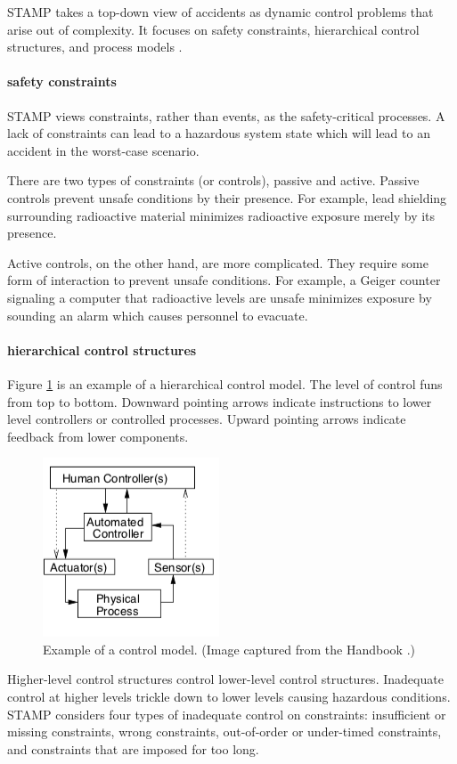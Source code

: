 \documentclass[../../main/main.tex]{subfiles}
\begin{document}
STAMP takes a top-down view of accidents as dynamic control problems that arise out of complexity.  It focuses on safety constraints, hierarchical control structures, and process models \cite{saferworld}. 

\paragraph*{safety constraints}
STAMP views constraints, rather than events, as the safety-critical processes.  A lack of constraints can lead to a hazardous system state which will lead to an accident in the worst-case scenario.  

There are two types of constraints (or controls), passive and active.  Passive controls prevent unsafe conditions by their presence.  For example, lead shielding surrounding radioactive material minimizes radioactive exposure merely by its presence.  

Active controls, on the other hand, are more complicated.  They require some form of interaction to prevent unsafe conditions.  For example, a Geiger counter signaling a computer that radioactive levels are unsafe minimizes exposure by sounding an alarm which causes personnel to evacuate.  

\paragraph*{hierarchical control structures}
Figure \ref{controlmodel} is an example of a hierarchical control model.  The level of control funs from top to bottom.  Downward pointing arrows indicate instructions to lower level controllers or controlled processes.  Upward pointing arrows indicate feedback from lower components.   

\begin{figure}[h!]
\centering
\includegraphics[width=0.5\linewidth]{../figures/controlmodel}
\caption{\label{controlmodel} Example of a control model. (Image captured from the  Handbook \cite{stpa}.)}
\end{figure}
Higher-level control structures control lower-level control structures.  Inadequate control at higher levels trickle down to lower levels causing hazardous conditions.  STAMP considers four types of inadequate control on constraints: insufficient or missing constraints, wrong constraints, out-of-order or under-timed constraints, and constraints that are imposed for too long. 
\end{document}
